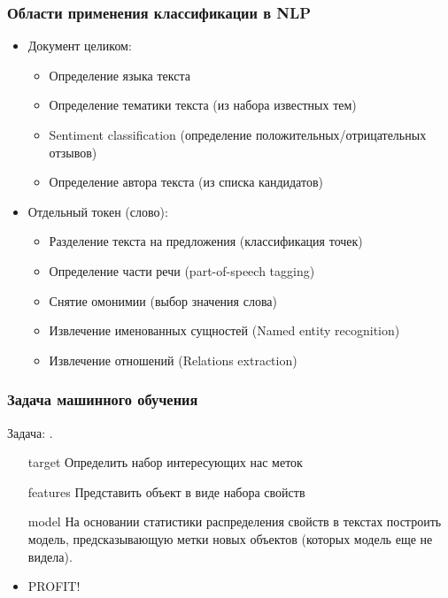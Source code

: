 \documentclass[svgnames]{beamer}
\begin{document}
\begin{frame}
  \frametitle{Области применения классификации в NLP}
  \begin{itemize}
  \item Документ целиком:
    \begin{itemize}
    \item  Определение языка текста
    \item Определение тематики текста (из набора известных тем)
    \item Sentiment classification (определение
      положительных/отрицательных отзывов)
    \item Определение автора текста (из списка кандидатов)
    \end{itemize}
  \item Отдельный токен (слово):
    \begin{itemize}
    \item Разделение текста на предложения (классификация точек)
    \item Определение части речи (part-of-speech tagging)
    \item Снятие омонимии (выбор значения слова)
    \item Извлечение именованных сущностей (Named entity recognition)
    \item Извлечение отношений (Relations extraction)
    \end{itemize}
  \end{itemize}
\end{frame}

\begin{frame}
  \frametitle{Задача машинного обучения}
  
Задача: . 

  \begin{itemize}
  \item[target] Определить набор интересующих нас меток
  \item[features] Представить объект в виде набора свойств
  \item[model] На основании статистики распределения свойств в
    текстах построить модель, предсказывающую метки новых объектов
    (которых модель еще не видела).
    \pause
  \item \alert{PROFIT!}
  \end{itemize}
\end{frame}
\end{document}
